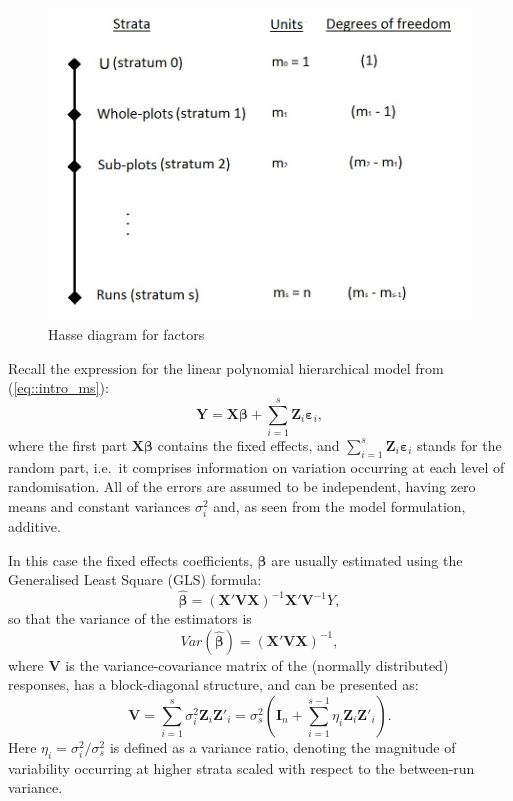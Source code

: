 \begin{figure}[h]
\begin{center}
\includegraphics[scale=0.85]{Hasse.jpg}      %
\caption{Hasse diagram for factors}
\label{Fig::Hasse}
\end{center}
\end{figure} 
 
Recall the expression for the linear polynomial hierarchical model from (\ref{eq::intro_ms}):
\begin{equation}
\label{eq::back_ms}
\bm{Y}=\bm{X}\bm{\beta}+\sum_{i=1}^{s}\bm{Z}_{i}\bm{\varepsilon}_{i},
\end{equation} 
where the first part $\bm{X\beta}$ contains the fixed effects, and $\sum_{i=1}^{s}\bm{Z}_{i}\bm{\varepsilon}_{i}$ stands for the random part, i.e.~it comprises information on variation occurring at each level of randomisation. All of the errors are assumed to be independent, having zero means and constant variances $\sigma^2_{i}$ and, as seen from the model formulation, additive.

In this case the fixed effects coefficients, $\bm{\beta}$ are usually estimated using the Generalised Least Square (GLS) formula:
\begin{equation}
\label{eq::back_gls}
\bm{\hat{\beta}}=(\bm{X}'\bm{VX})^{-1}\bm{X}'\bm{V}^{-1}Y,
\end{equation}
so that the variance of the estimators is
\begin{equation}
\label{eq::back_glsvar}
Var(\bm{\hat{\beta}})=(\bm{X}'\bm{VX})^{-1},
\end{equation}
where $\bm{V}$ is the variance-covariance matrix of the (normally distributed) responses, has a block-diagonal structure, and can be presented as:
\begin{equation}
\label{eq::back_glsV}
\bm{V}=\sum_{i=1}^{s}\sigma^2_{i}\bm{Z}_{i}\bm{Z}'_{i}=\sigma^{2}_{s}\left(\bm{I}_{n}+\sum_{i=1}^{s-1}\eta_{i}\bm{Z}_{i}\bm{Z}'_{i}\right).
\end{equation}
Here $\eta_{i}=\sigma^{2}_{i}/\sigma^{2}_{s}$ is defined as a variance ratio, denoting the magnitude of variability occurring at higher strata scaled with respect to the between-run variance.

